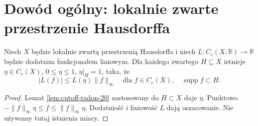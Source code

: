 \section{Dowód ogólny: lokalnie zwarte przestrzenie Hausdorffa}
\begin{lemat}\label{it:lem:radon-local-bound}
Niech $X$ będzie lokalnie zwartą przestrzenią Hausdorffa
i niech $L:C_c(X;\mathbb R)\to\mathbb R$ będzie
dodatnim funkcjonałem liniowym.
Dla każdego zwartego $H\subseteq X$ istnieje $\eta\in C_c(X)$, $0\le\eta\le1$, $\eta|_H=1$, taka, że
\[
 |L(f)|\le L(\eta)\|f\|_\infty
 \quad\text{dla }f\in C_c(X),\quad\operatorname{supp}f\subset H.
\]
\end{lemat}
\begin{proof}
Lemat \ref{lem:cutoff-radon-20} zastosowany do $H\subset X$ daje $\eta$. Punktowo $-\|f\|_\infty\eta\le f\le\|f\|_\infty\eta$. Dodatniość i liniowość $L$ dają oszacowanie. Nie używamy tutaj istnienia miary.
\end{proof}

